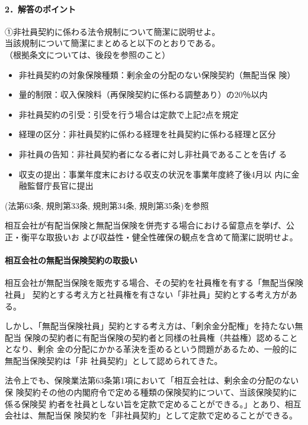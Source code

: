 \documentclass[report,gutter=10mm,fore-edge=10mm,uplatex,dvipdfmx]{jlreq}
\begin{document}
\paragraph{2．解答のポイント}
①非社員契約に係わる法令規制について簡潔に説明せよ。\\
当該規制について簡潔にまとめると以下のとおりである。\\
（根拠条文については、後段を参照のこと）
\begin{itemize}
 \item 非社員契約の対象保険種類：剰余金の分配のない保険契約（無配当保
 険）
 \item 量的制限：収入保険料（再保険契約に係わる調整あり）の20％以内
 \item 非社員契約の引受：引受を行う場合は定款で上記2点を規定
 \item 経理の区分：非社員契約に係わる経理を社員契約に係わる経理と区分
 \item 非社員の告知：非社員契約者になる者に対し非社員であることを告げ
 る
 \item 収支の提出：事業年度末における収支の状況を事業年度終了後4月以
 内に金融監督庁長官に提出
\end{itemize}

(法第63条, 規則第33条, 規則第34条, 規則第35条)を参照

相互会社が有配当保険と無配当保険を併売する場合における留意点を挙げ、公正・衡平な取扱いお
よび収益性・健全性確保の観点を含めて簡潔に説明せよ。
\paragraph{相互会社の無配当保険契約の取扱い}

相互会社が無配当保険を販売する場合、その契約を社員権を有する「無配当保険社員」
契約とする考え方と社員権を有さない「非社員」契約とする考え方がある。

しかし、「無配当保険社員」契約とする考え方は、「剰余金分配権」を持たない無配当
保険の契約者に有配当保険の契約者と同様の社員権（共益権）認めることとなり、剰余
金の分配にかかる革決を歪めるという問題があるため、一般的に無配当保険契約は「非
社員契約」として認められてきた。

法令上でも、保険業法第63条第1項において「相互会社は、剰余金の分配のない保
険契約その他の内閣府令で定める種類の保険契約について、当該保険契約に係る保険契
約者を社員としない旨を定款で定めることができる。」とあり、相互会社は、無配当保
険契約を「非社員契約」として定款で定めることができる。
\end{document}
